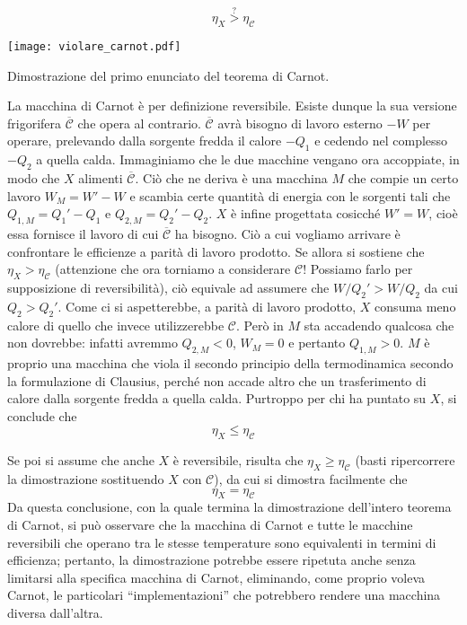 \[\eta_X \stackrel{?}{>} \eta_\mathcal{C} \]

\begin{marginfigure}
    \centering
    \texttt{[image: violare\_carnot.pdf]}
    \caption{Dimostrazione del primo enunciato del teorema di
    Carnot.}
    \label{teo_carnot}
\end{marginfigure}

La macchina di Carnot è per definizione reversibile. Esiste dunque
la sua versione frigorifera $\overline{\mathcal{C}}$ che opera al contrario.
$\overline{\mathcal{C}}$ avrà bisogno di lavoro esterno $-W$ per operare,
prelevando dalla sorgente fredda il calore $-Q_1$ e cedendo nel
complesso $-Q_2$ a quella calda. Immaginiamo che le due macchine
vengano ora accoppiate, in modo che $X$ alimenti $\overline{\mathcal{C}}$.
Ciò che ne deriva è una macchina $M$ che compie un certo lavoro
$W_M = W' - W$ e scambia certe quantità di energia con le sorgenti
tali che $Q_{1,M} = Q_1'-Q_1$ e $Q_{2,M} = Q_2' - Q_2$. $X$ è infine
progettata cosicché $W' = W$, cioè essa fornisce il lavoro di cui
$\overline{\mathcal{C}}$ ha bisogno. Ciò a cui vogliamo arrivare è
confrontare le efficienze a parità di lavoro prodotto.
Se allora si sostiene che $\eta_X > \eta_\mathcal{C}$ (attenzione che
ora torniamo a considerare $\mathcal{C}$! Possiamo farlo per supposizione
di reversibilità), ciò equivale
ad assumere che $W/Q_2' > W/Q_2$ da cui $Q_2 > Q_2'$. Come ci si
aspetterebbe, a parità di lavoro prodotto, $X$ consuma meno calore di
quello che invece utilizzerebbe $\mathcal{C}$.
Però in $M$ sta accadendo qualcosa che non dovrebbe: infatti
avremmo $Q_{2,M} < 0$, $W_M = 0$ e pertanto $Q_{1,M} > 0$. $M$ è proprio
una macchina che viola il secondo principio della
termodinamica secondo la formulazione di Clausius, perché non accade
altro che un trasferimento di calore dalla sorgente fredda a quella calda.
Purtroppo per chi ha puntato su $X$, si conclude che \[ \eta_X \leq \eta_\mathcal{C} \]

Se poi si assume che anche $X$ è reversibile, risulta che
$\eta_X \geq \eta_\mathcal{C}$ (basti ripercorrere la dimostrazione
sostituendo $X$ con $\mathcal{C}$), da cui si dimostra facilmente
che \[ \eta_X = \eta_\mathcal{C} \] Da questa conclusione, con
la quale termina la dimostrazione dell'intero teorema di Carnot,
si può osservare che la macchina di Carnot e tutte le macchine
reversibili che operano tra le stesse temperature sono equivalenti
in termini di efficienza; pertanto, la dimostrazione potrebbe essere
ripetuta anche senza limitarsi alla specifica macchina di Carnot,
eliminando, come proprio voleva Carnot, le particolari ``implementazioni''
che potrebbero rendere una macchina diversa dall'altra.

